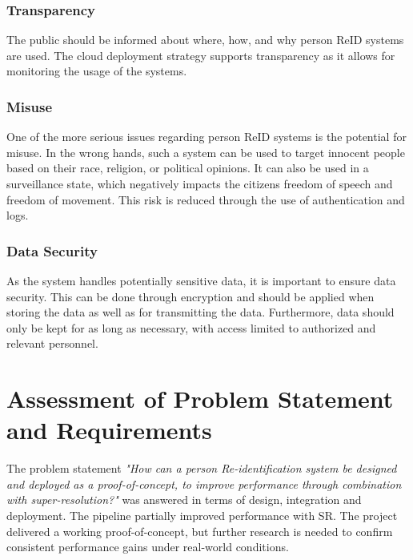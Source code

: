 \subsubsection{Transparency}
The public should be informed about where, how, and why person \acs{ReID} systems are used. The cloud deployment strategy supports transparency as it allows for monitoring the usage of the systems. 

\subsubsection{Misuse}
One of the more serious issues regarding person \acs{ReID} systems is the potential for misuse. In the wrong hands, such a system can be used to target innocent people based on their race, religion, or political opinions. It can also be used in a surveillance state, which negatively impacts the citizens freedom of speech and freedom of movement. This risk is reduced through the use of authentication and logs.

\subsubsection{Data Security}
As the system handles potentially sensitive data, it is important to ensure data security. This can be done through encryption and should be applied when storing the data as well as for transmitting the data. Furthermore, data should only be kept for as long as necessary, with access limited to authorized and relevant personnel. 

\section{Assessment of Problem Statement and Requirements}

The problem statement \textit{"How can a person Re-identification system be designed and deployed as a proof-of-concept, to
improve performance through combination with super-resolution?"} was answered in terms of design, integration and deployment. The pipeline partially improved performance with \acs{SR}. The project delivered a working proof-of-concept, but further research is needed to confirm consistent performance gains under real-world conditions. 
\\\\

